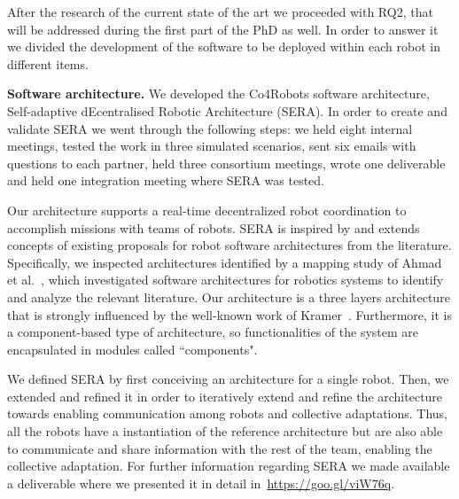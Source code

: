 After the research of the current state of the art we proceeded with RQ2, that will be addressed during the first part of the PhD as well.
In order to answer it %
we divided the development of the software to be deployed within each robot in different items.

\textbf{Software architecture.}
We developed the Co4Robots software architecture, Self-adaptive dEcentralised Robotic Architecture (SERA).
In order to create and validate SERA we went through the following steps: %
we held eight internal meetings, tested the work in three simulated scenarios, sent six emails with questions to each partner, held three consortium meetings, wrote one deliverable and held one integration meeting where SERA was tested.

Our architecture supports a real-time decentralized robot coordination to accomplish missions with teams of robots. 
SERA is inspired by and extends concepts of existing proposals for robot software architectures from the literature. 
Specifically, we inspected architectures identified by a mapping study of Ahmad et al.~\cite{Ahmad201616}, which investigated software architectures for robotics systems to identify and analyze the relevant literature. %
Our architecture is a three layers architecture that is strongly influenced by the well-known work of Kramer~\cite{kramer}.
Furthermore, it is a component-based type of architecture, so functionalities of the system are encapsulated in modules called ``components".


We defined SERA by first conceiving an architecture for a single robot. 
Then, we extended and refined it in order to iteratively extend and refine the architecture towards enabling communication among robots and collective adaptations. 
Thus, all the robots have a instantiation of the reference architecture but are also able to communicate and share information with the rest of the team, enabling the collective adaptation. 
For further information regarding SERA we made available a deliverable where we presented it in detail in~\url{https://goo.gl/viW76q}.

